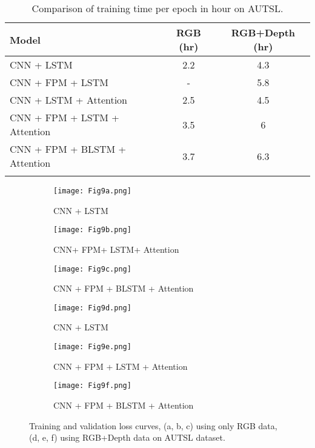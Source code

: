 \documentclass[11pt, a4paper, singlecolumn]{article}
\begin{document}
 
\begin{table}[t]
	\caption{Comparison of training time per epoch in hour on AUTSL.}
	\centering
	\label{tab:times}
	\begin{tabular}{ lcc }
		\hline
		\textbf{Model} & \textbf{RGB (hr)}  & \textbf{RGB+Depth (hr)} \\ \hline
		CNN + LSTM       & 2.2  & 4.3  \\ 
		CNN + FPM + LSTM     & -  & 5.8  \\ 
		CNN + LSTM + Attention       & 2.5 & 4.5 \\ 
		CNN + FPM + LSTM + Attention      & 3.5 & 6  \\ 
		CNN + FPM + BLSTM + Attention    & 3.7 & 6.3  \\ \\ \hline
		
	\end{tabular}
\end{table}


\begin{figure} 
	\centering
	\begin{subfigure}{0.32\textwidth}
		\texttt{[image: Fig9a.png]}	
		\caption{CNN + LSTM}
		\label{fig:44_3}	
	\end{subfigure}		
	\begin{subfigure}{0.32\textwidth}
		\texttt{[image: Fig9b.png]}
		\caption{CNN+ FPM+ LSTM+ Attention}
		\label{fig:42_3}
	\end{subfigure}		
	\begin{subfigure}{0.32\textwidth}
		\texttt{[image: Fig9c.png]}
		\caption{CNN + FPM + BLSTM + Attention}
		\label{fig:46_3}
	\end{subfigure}
\begin{subfigure}{0.32\textwidth}
	\texttt{[image: Fig9d.png]}	
	\caption{CNN + LSTM}
	\label{fig:54_3}	
\end{subfigure}		
\begin{subfigure}{0.32\textwidth}
	\texttt{[image: Fig9e.png]}
	\caption{CNN + FPM + LSTM + Attention}
	\label{fig:52_3}
\end{subfigure}		
\begin{subfigure}{0.32\textwidth}
	\texttt{[image: Fig9f.png]}
	\caption{CNN + FPM + BLSTM + Attention}
	\label{fig:56_3}
\end{subfigure}
	\caption{Training and validation loss curves, (a, b, c) using only RGB data, (d, e, f) using RGB+Depth data on AUTSL dataset. }
	\label{fig9}       \end{figure}
\end{document}
